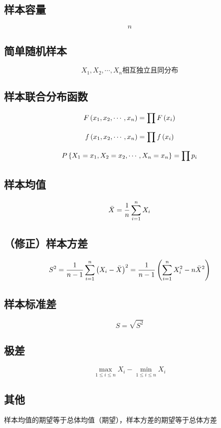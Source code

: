\documentclass{article}
\begin{document}
\subsection{样本容量}

\[n\]

\subsection{简单随机样本}

\[X_1,X_2,\cdots,X_n\text{相互独立且同分布}\]

\subsection{样本联合分布函数}

\[F\left(x_1,x_2,\cdots,x_n\right)=\prod F\left(x_i\right)\]

\[f\left(x_1,x_2,\cdots,x_n\right)=\prod f\left(x_i\right)\]

\[P\left\{X_1=x_1,X_2=x_2,\cdots,X_n=x_n\right\}=\prod p_i\]

\subsection{样本均值}

\[\bar X=\frac1n\sum\limits_{i=1}^n X_i\]

\subsection{（修正）样本方差}

\[S^2=\frac1{n-1}\sum\limits_{i=1}^n{\left(X_i-\bar X\right)}^2=\frac1{n-1}\left(\sum\limits_{i=1}^n X_i^2-n\bar X^2\right)\]

\subsection{样本标准差}

\[S=\sqrt{S^2}\]

\subsection{极差}

\[\max_{1\leqslant i\leqslant n}X_i-\min_{1\leqslant i\leqslant n}X_i\]

\subsection{其他}

样本均值的期望等于总体均值（期望），样本方差的期望等于总体方差
\end{document}
